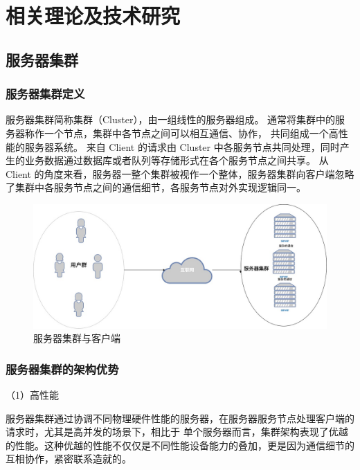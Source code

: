 \chapter{相关理论及技术研究}

\section{服务器集群}

\subsection{服务器集群定义}

服务器集群简称集群（Cluster），由一组线性的服务器组成。
通常将集群中的服务器称作一个节点，集群中各节点之间可以相互通信、协作，
共同组成一个高性能的服务器系统\cite{kanellopoulos2022dynamic}。
来自 Client 的请求由 Cluster 中各服务节点共同处理，同时产生的业务数据通过数据库或者队列等存储形式在各个服务节点之间共享。
从 Client 的角度来看，服务器一整个集群被视作一个整体，服务器集群向客户端忽略了集群中各服务节点之间的通信细节，各服务节点对外实现逻辑同一。

\begin{figure}[ht]
  \centering
  \includegraphics[width=\textwidth]{figures/cluster-and-client.jpg}
  \caption{服务器集群与客户端}
\end{figure}

\subsection{服务器集群的架构优势}

（1）高性能

服务器集群通过协调不同物理硬件性能的服务器，在服务器服务节点处理客户端的请求时，尤其是高并发的场景下，相比于
单个服务器而言，集群架构表现了优越的性能。这种优越的性能不仅仅是不同性能设备能力的叠加，更是因为通信细节的互相协作，紧密联系造就的。


